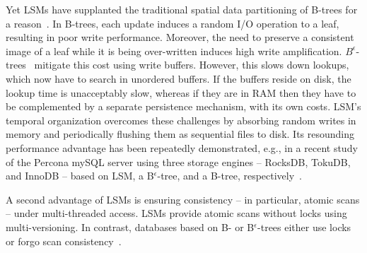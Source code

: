 Yet  LSMs have supplanted the  traditional spatial data partitioning of B-trees for a reason~\cite{rocks-vs-inno}.
In  B-trees, each update induces a random I/O operation to a leaf, resulting in poor write performance.
Moreover, the need to preserve a consistent image of a leaf while it is being over-written induces high write amplification. 
$B^{\epsilon}$-trees~\cite{Brodal:2003:LBE:644108.644201} mitigate this cost using write buffers. %
However, this slows down lookups, which now have to search in %
unordered buffers. 
If the buffers reside on disk, the lookup time is unacceptably slow, whereas
if they are in RAM then they have to be complemented by a separate persistence mechanism, with its own costs.  
LSM's temporal organization overcomes these challenges by absorbing random writes in memory and periodically flushing them as 
sequential files to disk. 
Its resounding performance advantage has been repeatedly demonstrated, 
e.g., in a recent  study of the Percona mySQL server using three storage engines -- RocksDB, TokuDB, and InnoDB --
based on LSM, a B$^{\epsilon}$-tree, and a B-tree, respectively~\cite{toku-rocks-inno}.




 
A second advantage of LSMs is ensuring consistency -- in particular, atomic scans --   under multi-threaded access. 
LSMs provide atomic scans without locks using multi-versioning. 
In contrast, databases based on B- or  B$^\epsilon$-trees either use locks~\cite{innodblocking} 
or forgo scan consistency~\cite{tucana}.



